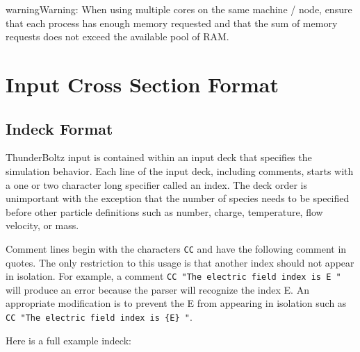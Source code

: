 \documentclass[letterpaper,10pt,english,openany,oneside]{sphinxmanual}
\begin{document}
\begin{sphinxadmonition}{warning}{Warning:}
\sphinxAtStartPar
When using multiple cores on the same machine / node, ensure
that each process has enough memory requested and that
the sum of memory requests does not exceed the available
pool of RAM.
\end{sphinxadmonition}

\chapter{Input Cross Section Format}

\section{Indeck Format}

ThunderBoltz input is contained within an input deck that specifies the simulation
behavior. Each line of the input deck, including comments, starts with a one or two
character long specifier called an index. The deck order is unimportant with the
exception that the number of species needs to be specified before other particle
definitions such as number, charge, temperature, flow velocity, or mass.

Comment lines begin with the characters \texttt{CC} and have the following comment in
quotes. The only restriction to this usage is that another index should not appear in
isolation. For example, a comment \texttt{CC "The electric field index is E "} will
produce an error because the parser will recognize the index E. An appropriate
modification is to prevent the E from appearing in isolation such as \texttt{CC "The
electric field index is \{E\} "}.

Here is a full example indeck:
\end{document}
